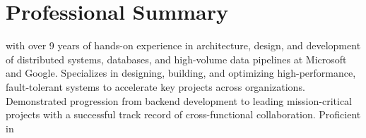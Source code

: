 \section{Professional Summary}
\normalsize{\POSITION{} with over 9 years of hands-on experience in architecture, design, and development of
    distributed systems, databases, and high-volume data pipelines at Microsoft and Google. Specializes in designing,
    building, and optimizing high-performance, fault-tolerant systems to accelerate key projects across organizations.
    Demonstrated progression from backend development to leading mission-critical projects with a successful track
    record of cross-functional collaboration. Proficient in \LanguagesOrderSummary\MainTechnologies}
